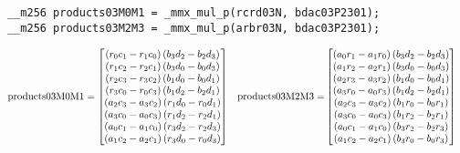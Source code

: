 \begin{verbatim}
__m256 products03M0M1 = _mmx_mul_p(rcrd03N, bdac03P2301);
__m256 products03M2M3 = _mmx_mul_p(arbr03N, bdac03P2301);
\end{verbatim} 
\begin{align*}
\mathrm{products03M0M1} 
=
\begin{bmatrix}
\left(r_0c_1 - r_1c_0\right)\left(b_3d_2 - b_2d_3\right)\\
\left(r_1c_2 - r_2c_1\right)\left(b_3d_0 - b_0d_3\right)\\
\left(r_2c_3 - r_3c_2\right)\left(b_1d_0 - b_0d_1\right)\\
\left(r_3c_0 - r_0c_3\right)\left(b_1d_2 - b_2d_1\right)\\
\left(a_2c_3 - a_3c_2\right)\left(r_1d_0 - r_0d_1\right)\\
\left(a_3c_0 - a_0c_3\right)\left(r_1d_2 - r_2d_1\right)\\
\left(a_0c_1 - a_1c_0\right)\left(r_3d_2 - r_2d_3\right)\\
\left(a_1c_2 - a_2c_1\right)\left(r_3d_0 - r_0d_3\right)\\
\end{bmatrix}
&&
\mathrm{products03M2M3} 
=&
\begin{bmatrix}
\left(a_0r_1 - a_1r_0\right)\left(b_3d_2 - b_2d_3\right)\\
\left(a_1r_2 - a_2r_1\right)\left(b_3d_0 - b_0d_3\right)\\
\left(a_2r_3 - a_3r_2\right)\left(b_1d_0 - b_0d_1\right)\\
\left(a_3r_0 - a_0r_3\right)\left(b_1d_2 - b_2d_1\right)\\
\left(a_2c_3 - a_3c_2\right)\left(b_1r_0 - b_0r_1\right)\\
\left(a_3c_0 - a_0c_3\right)\left(b_1r_2 - b_2r_1\right)\\
\left(a_0c_1 - a_1c_0\right)\left(b_3r_2 - b_2r_3\right)\\
\left(a_1c_2 - a_2c_1\right)\left(b_3r_0 - b_0r_3\right)\\
\end{bmatrix}
\end{align*}

